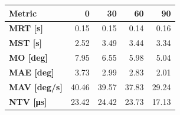 \begin{tabular*}{\textwidth}{@{\extracolsep{\fill}}l|rrrr}
    \toprule
    \textbf{Metric} & \textbf{0} & \textbf{30} & \textbf{60} & \textbf{90} \\
    \midrule
    \textbf{MRT [s]} & 0.15 & 0.15 & 0.14 & 0.16 \\
    \textbf{MST [s]} & 2.52 & 3.49 & 3.44 & 3.34 \\
    \textbf{MO  [deg]} & 7.95 & 6.55 & 5.98 & 5.04 \\
    \textbf{MAE [deg]} & 3.73 & 2.99 & 2.83 & 2.01 \\
    \textbf{MAV [deg/s]} & 40.46 & 39.57 & 37.83 & 29.24 \\
    \textbf{NTV [\si{\micro\second}]} & 23.42 & 24.42 & 23.73 & 17.13 \\
    \bottomrule
\end{tabular*}

